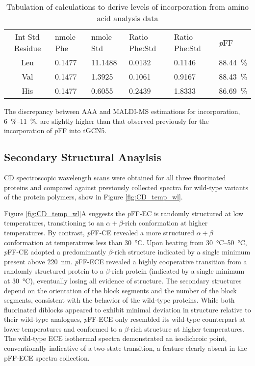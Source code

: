 \begin{refsection}
\begin{table}[h!]
\begin{tabular}{ clllll }
  \hline
  Int Std Residue & nmole Phe & nmole Std & Ratio Phe:Std & Ratio Phe:Std& \emph{p}FF \\
  Leu & 0.1477 & 11.1488 & 0.0132 & 0.1146 & \SI{88.44}{\percent} \\
  Val & 0.1477 & 1.3925 & 0.1061 & 0.9167 & \SI{88.43}{\percent} \\
  His & 0.1477 & 0.6055 & 0.2439 & 1.8333 & \SI{86.69}{\percent} \\
  \hline
\end{tabular}
\caption{Tabulation of calculations to derive levels of incorporation from amino
acid analysis data}
\label{tab:aaa_analysis}
\end{table}
The discrepancy between AAA and MALDI-MS estimations for incorporation,
\SIrange[range-phrase=--]{6}{11}{\percent}, are slightly higher than that
observed previously for the incorporation of \emph{p}FF into tGCN5.\cite{Voloshchuk2009}

\subsection{Secondary Structural Anaylsis}
CD spectroscopic wavelength scans were obtained for all three fluorinated
proteins and compared against previously collected spectra for wild-type
variants of the protein polymers, show in Figure
\ref{fig:CD_temp_wl}.\cite{Haghpanah2009} 

Figure \ref{fig:CD_temp_wl}A suggests the \emph{p}FF-EC is randomly structured
at low temperatures, transitioning to an ${\alpha+\beta}$-rich conformation  at
higher temperatures. By contrast, \emph{p}FF-CE revealed a more structured
${\alpha+\beta}$ conformation at temperatures less than \SI{30}{\celsius}. Upon
heating from \SIrange{30}{50}{\celsius}, \emph{p}FF-CE adopted a predominantly
${\beta}$-rich structure indicated by a single minimum present above
\SI{220}{\nm}. \emph{p}FF-ECE revealed a highly cooperative transition from a
randomly structured protein to a ${\beta}$-rich protein (indicated by a single
minimum at \SI{30}{\celsius}), eventually losing all evidence of structure. The
secondary structures depend on the orientation of the block segments and the
number of the block segments, consistent with the behavior of the wild-type 
proteins.\cite{Haghpanah2009} While both fluorinated diblocks appeared to
exhibit minimal deviation in structure relative to their wild-type analogues,
\emph{p}FF-ECE only resembled its wild-type counterpart at lower temperatures and
conformed to a ${\beta}$-rich structure at higher temperatures. The wild-type
ECE isothermal spectra demonstrated an isodichroic point, conventionally indicative of a
two-state transition, a feature clearly absent in the pFF-ECE spectra
collection.


\end{refsection}
